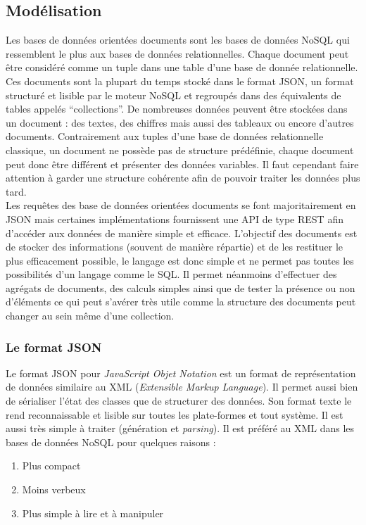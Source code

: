 \subsection{Modélisation}

  Les bases de données orientées documents sont les bases de données NoSQL qui ressemblent le plus aux bases de données relationnelles. Chaque document peut être considéré comme un tuple dans une table d'une base de donnée relationnelle. Ces documents sont la plupart du temps stocké dans le format JSON, un format structuré et lisible par le moteur NoSQL et regroupés dans des équivalents de tables appelés \enquote{collections}. De nombreuses données peuvent être stockées dans un document : des textes, des chiffres mais aussi des tableaux ou encore d'autres documents. Contrairement aux tuples d'une base de données relationnelle classique, un document ne possède pas de structure prédéfinie, chaque document peut donc être différent et présenter des données variables. Il faut cependant faire attention à garder une structure cohérente afin de pouvoir traiter les données plus tard.\\

  Les requêtes des base de données orientées documents se font majoritairement en JSON mais certaines implémentations fournissent une API de type REST afin d’accéder aux données de manière simple et efficace. L'objectif des documents est de stocker des informations (souvent de manière répartie) et de les restituer le plus efficacement possible, le langage est donc simple et ne permet pas toutes les possibilités d'un langage comme le SQL. Il permet néanmoins d'effectuer des agrégats de documents, des calculs simples ainsi que de tester la présence ou non d'éléments ce qui peut s'avérer très utile comme la structure des documents peut changer au sein même d'une collection.

\subsubsection{Le format JSON}

  Le format JSON pour \textit{JavaScript Objet Notation} est un format de représentation de données similaire au XML (\textit{Extensible Markup Language}). Il permet aussi bien de sérialiser l'état des classes que de structurer des données. Son format texte le rend reconnaissable et lisible sur toutes les plate-formes et tout système. Il est aussi très simple à traiter (génération et \textit{parsing}). Il est préféré au XML dans les bases de données NoSQL pour quelques raisons :
  \vspace{10px}
  \begin{enumerate}
    \item Plus compact
    \item Moins verbeux
    \item Plus simple à lire et à manipuler
  \end{enumerate}

